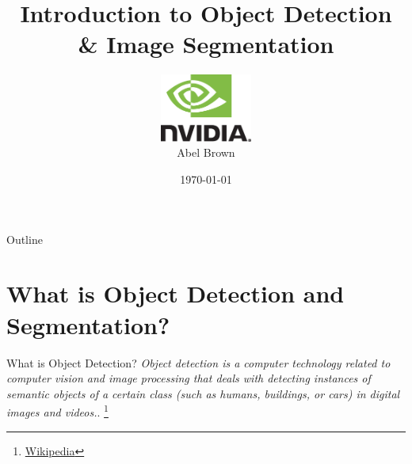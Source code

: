 \documentclass[handout]{beamer}
\title{Introduction to Object Detection \\ \& Image Segmentation}
\author{
	\includegraphics[width=3cm]{../media/logo/NVLogo_2D.eps}
	\vspace{0.75cm}
	\\Abel Brown}
\date{\today}
\begin{document}
\frame{\titlepage}

\begin{frame}{Outline}
\tableofcontents
\end{frame}





%

\section{What is Object Detection and Segmentation?}
\begin{frame}{What is Object Detection?}
\emph{Object detection is a computer technology related to computer vision and image processing that deals with detecting instances of semantic objects of a certain class (such as humans, buildings, or cars) in digital images and videos.}. \footnote{\href{https://en.wikipedia.org/wiki/Object_detection}{\color{blue}Wikipedia}}
\end{frame}
\end{document}
